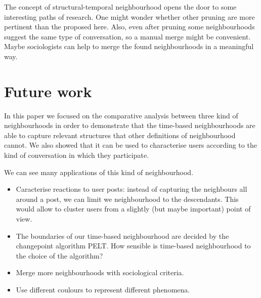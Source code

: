 \documentclass[conference]{IEEEtran}
\begin{document}
The concept of structural-temporal neighbourhood opens the door to some interesting paths of research. One might wonder whether other pruning are more pertinent than the proposed here. Also, even after pruning some neighbourhoods suggest the same type of conversation, so a manual merge might be convenient. Maybe sociologists can help to merge the found neighbourhoods in a meaningful way.   

\section{Future work}
In this paper we focused on the comparative analysis between three kind of neighbourhoods in order to demonstrate that the time-based neighbourhoods are able to capture relevant structures that other definitions of neighbourhood cannot. We also showed that it can be used to characterise users according to the kind of conversation in which they participate.

We can see many applications of this kind of neighbourhood.

\begin{itemize}
\item  Caracterise reactions to user posts: instead of capturing the neighbours all around a post, we can limit we neighbourhood to the descendants. This would allow to cluster users from a slightly (but maybe important) point of view. 
\item The boundaries of our time-based neighbourhood are decided by the changepoint algorithm PELT. How sensible is time-based neighbourhood to the choice of the algorithm?  
\item Merge more neighbourhoods with sociological criteria.
\item Use different coulours to represent different phenomena.
\end{itemize}
\end{document}
